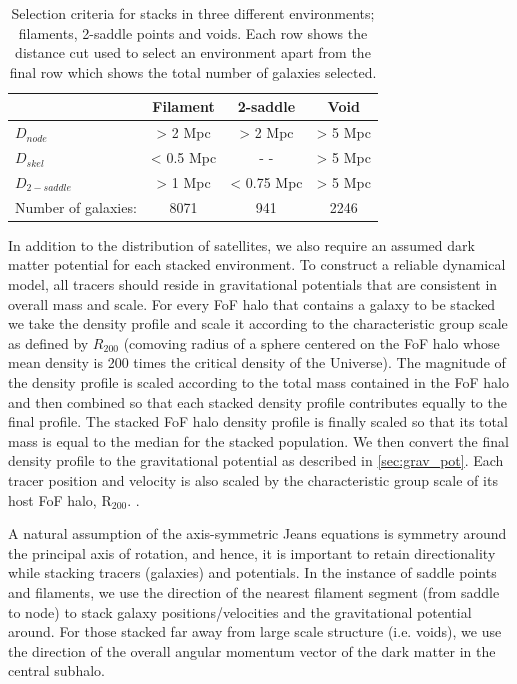 \begin{table}
\centering
\begin{tabular}{|l|c|c|c|}
\hline
& Filament & 2-saddle & Void \\ \hline
$D_{node}$ & > 2 Mpc & > 2 Mpc & > 5 Mpc \\
$D_{skel}$ & < 0.5 Mpc  & - - & > 5 Mpc \\
$D_{2-saddle}$ & > 1 Mpc & < 0.75 Mpc & > 5 Mpc \\
Number of galaxies: & 8071 & 941 & 2246 \\
\hline
\end{tabular}
\caption{Selection criteria for stacks in three different environments; filaments, 2-saddle points and voids. Each row shows the distance cut used to select an environment apart from the final row which shows the total number of galaxies selected.}
\label{tab:stacking}
\end{table}

In addition to the distribution of satellites, we also require an assumed dark matter potential for each stacked environment. To construct a reliable dynamical model, all tracers should reside in gravitational potentials that are consistent in overall mass and scale. For every FoF halo that contains a galaxy to be stacked we take the density profile and scale it according to the characteristic group scale as defined by $R_{200}$ (comoving radius of a sphere centered on the FoF halo whose mean density is 200 times the critical density of the Universe). The magnitude of the density profile is scaled according to the total mass contained in the FoF halo and then combined so that each stacked density profile contributes equally to the final profile. The stacked FoF halo density profile is finally scaled so that its total mass is equal to the median for the stacked population. We then convert the final density profile to the gravitational potential as described in \ref{sec:grav_pot}. Each tracer position and velocity is also scaled by the characteristic group scale of its host FoF halo, $\mathrm{R_{200}}$. . 

A natural assumption of the axis-symmetric Jeans equations is symmetry around the principal axis of rotation, and hence, it is important to retain directionality while stacking tracers (galaxies) and potentials. In the instance of saddle points and filaments, we use the direction of the nearest filament segment (from saddle to node) to stack galaxy positions/velocities and the gravitational potential around. For those stacked far away from large scale structure (i.e. voids), we use the direction of the overall angular momentum vector of the dark matter in the central subhalo.

